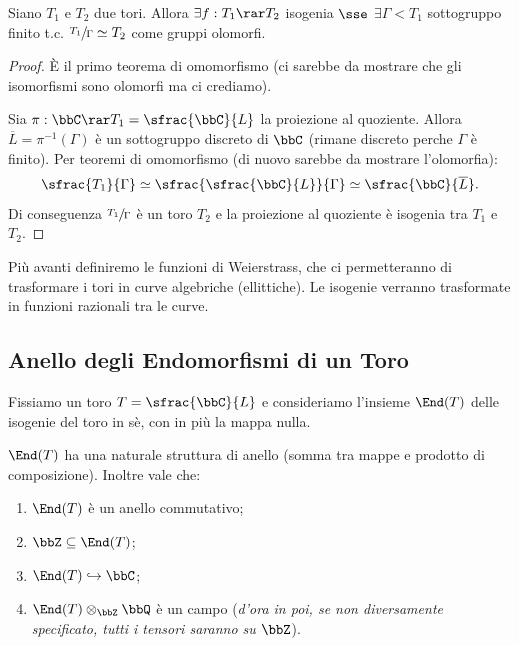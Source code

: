     \begin{proposizione}
    Siano $T_{1}$ e $T_{2}$ due tori. Allora
    $\exists f:T_{1} \rar T_{2}$ isogenia $\sse$ $\exists \Gamma < T_{1}$ sottogruppo finito t.c. $\sfrac{T_{1}}{\Gamma} \simeq T_{2}$ come gruppi olomorfi.
    \end{proposizione}
    \begin{proof}
      \fbox{$\Rar$} È il primo teorema di omomorfismo (ci sarebbe da mostrare che gli isomorfismi sono olomorfi ma ci crediamo).

      \fbox{$\Leftarrow$} Sia $\pi:\bbC \rar T_{1} = \sfrac{\bbC}{L}$ la proiezione al quoziente. Allora $\overline{L}=\pi^{-1}(\Gamma)$ è un sottogruppo discreto di $\bbC$ (rimane discreto perche $\Gamma$ è finito). Per teoremi di omomorfismo (di nuovo sarebbe da mostrare l'olomorfia):
		\[
			\sfrac{T_{1}}{\Gamma} \simeq \sfrac{\sfrac{\bbC}{L}}{\Gamma} \simeq \sfrac{\bbC}{\overline{L}}.
		\]
    Di conseguenza $\sfrac{T_{1}}{\Gamma}$ è un toro $T_{2}$ e la proiezione al quoziente è isogenia tra $T_{1}$ e $T_{2}$.
    \end{proof}

    Più avanti definiremo le funzioni di Weierstrass, che ci permetteranno di trasformare i tori in curve algebriche (ellittiche). Le isogenie verranno trasformate in funzioni razionali tra le curve.

\subsection{Anello degli Endomorfismi di un Toro}

    Fissiamo un toro $T=\sfrac{\bbC}{L}$ e consideriamo l'insieme $\End(T)$ delle isogenie del toro in sè, con in più la mappa nulla.

    \begin{proposizione} $\End(T)$ ha una naturale struttura di anello (somma tra mappe e prodotto di composizione). Inoltre vale che:
    \begin{enumerate}
    \item $\End(T)$ è un anello commutativo;
    \item $\bbZ \subseteq \End(T)$;
    \item $\End(T) \hookrightarrow \bbC$;
    \item $\End(T) \otimes_{\bbZ} \bbQ$ è un campo ({\it d'ora in poi, se non diversamente specificato, tutti i tensori saranno su $\bbZ$}).
    \end{enumerate}
    \end{proposizione}

